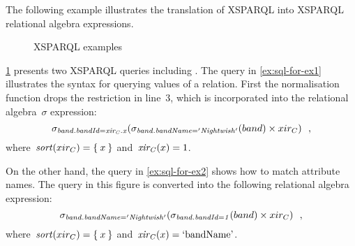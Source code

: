 %
The following example illustrates the translation of XSPARQL  into XSPARQL relational algebra
expressions.
%
\begin{figure}[t]
  \caption{XSPARQL \SQLForClause examples}%
  \label{fig:sql-for-ex}%
\end{figure}
%
\begin{example}
  \cref{fig:sql-for-ex} presents two XSPARQL queries including .
  The query in \cref{ex:sql-for-ex1} illustrates the syntax for querying values of a relation.  First the
  normalisation function drops the restriction in line~3, which is incorporated into the relational algebra~$\sigma$
  expression:
  \[
  \mathit{\sigma_{band.bandId = xir_C.x}}\!\left(\mathit{\sigma_{band.bandName = 'Nightwish'}}\!\left(band\right) \times xir_C\right) \enspace ,
  \]
  where~$\mathit{sort}\!\left(xir_C\right) = \left\{\:x\:\right\}$ and~$\mathit{xir_C}\!\left(x\right) = 1$.

  \medskip

  On the other hand, the query in \cref{ex:sql-for-ex2} shows how to match attribute names.
  The query in this figure is converted into the following relational algebra expression:
  \[
  \mathit{\sigma_{band.bandName = 'Nightwish'}}\!\left(\mathit{\sigma_{band.bandId = 1}}\!\left(band\right) \times xir_C\right) \enspace ,
  \]
  where~$\mathit{sort}\!\left(xir_C\right) = \left\{\:x\:\right\}$ and~$\mathit{xir_C}\!\left(x\right) = \textrm{`bandName'}$.  
\end{example}







